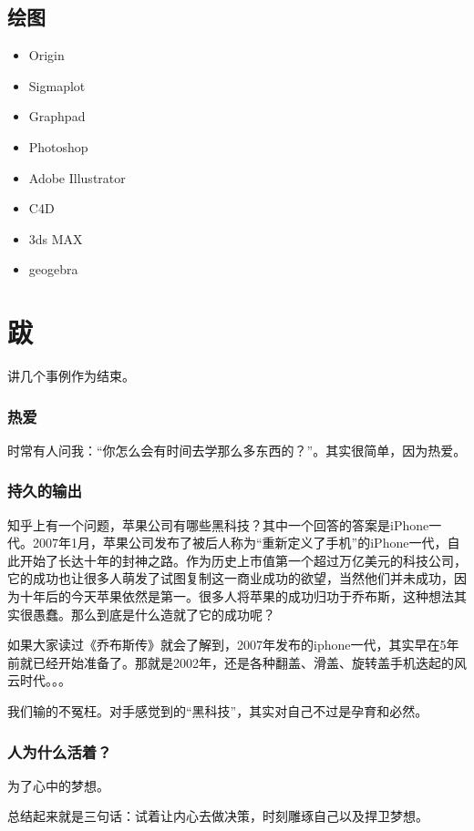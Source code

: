 \documentclass[UTF8,oneside]{ctexbook}
\begin{document}
\section{绘图}
\begin{itemize}
	\item Origin
	\item Sigmaplot
	\item Graphpad
	\item Photoshop
	\item Adobe Illustrator
	\item C4D
	\item 3ds MAX
	\item geogebra
\end{itemize}

\backmatter
\chapter*{跋}
讲几个事例作为结束。

\subsection*{热爱}
时常有人问我：“你怎么会有时间去学那么多东西的？”。其实很简单，因为热爱。

\subsection*{持久的输出}
知乎上有一个问题，苹果公司有哪些黑科技？其中一个回答的答案是iPhone一代。2007年1月，苹果公司发布了被后人称为“重新定义了手机”的iPhone一代，自此开始了长达十年的封神之路。作为历史上市值第一个超过万亿美元的科技公司，它的成功也让很多人萌发了试图复制这一商业成功的欲望，当然他们并未成功，因为十年后的今天苹果依然是第一。很多人将苹果的成功归功于乔布斯，这种想法其实很愚蠢。那么到底是什么造就了它的成功呢？

如果大家读过《乔布斯传》就会了解到，2007年发布的iphone一代，其实早在5年前就已经开始准备了。那就是2002年，还是各种翻盖、滑盖、旋转盖手机迭起的风云时代。。。

我们输的不冤枉。对手感觉到的“黑科技”，其实对自己不过是孕育和必然。

\subsection*{人为什么活着？}
为了心中的梦想。

\vspace{2cm}
总结起来就是三句话：试着让内心去做决策，时刻雕琢自己以及捍卫梦想。
\end{document}

